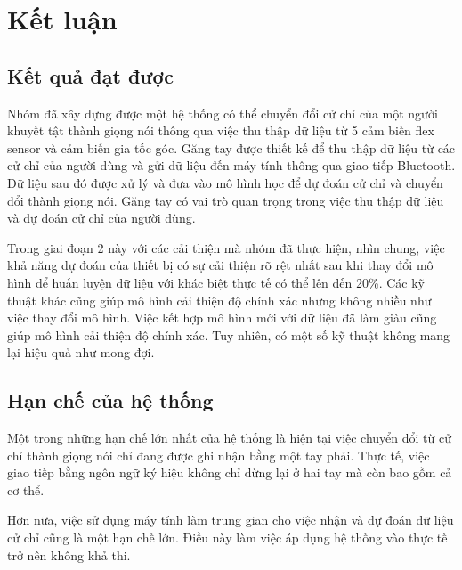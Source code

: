 \section{Kết luận}
\subsection{Kết quả đạt được}

\indent Nhóm đã xây dựng được một hệ thống có thể chuyển đổi cử chỉ của một người khuyết tật thành giọng nói thông qua việc thu thập dữ liệu từ 5 cảm biến flex sensor và cảm biến gia tốc góc. Găng tay được thiết kế để thu thập dữ liệu từ các cử chỉ của người dùng và gửi dữ liệu đến máy tính thông qua giao tiếp Bluetooth. Dữ liệu sau đó được xử lý và đưa vào mô hình học để dự đoán cử chỉ và chuyển đổi thành giọng nói. Găng tay có vai trò quan trọng trong việc thu thập dữ liệu và dự đoán cử chỉ của người dùng.


\indent Trong giai đoạn 2 này với các cải thiện mà nhóm đã thực hiện, nhìn chung, việc khả năng dự đoán của thiết bị có sự cải thiện rõ rệt nhất sau khi thay đổi mô hình để huấn luyện dữ liệu với khác biệt thực tế có thể lên đến 20\%. Các kỹ thuật khác cũng giúp mô hình cải thiện độ chính xác nhưng không nhiều như việc thay đổi mô hình. Việc kết hợp mô hình mới với dữ liệu đã làm giàu cũng giúp mô hình cải thiện độ chính xác. Tuy nhiên, có một số kỹ thuật không mang lại hiệu quả như mong đợi.

\subsection{Hạn chế của hệ thống}
\indent Một trong những hạn chế lớn nhất của hệ thống là hiện tại việc chuyển đổi từ cử chỉ thành giọng nói chỉ đang được ghi nhận bằng một tay phải. Thực tế, việc giao tiếp bằng ngôn ngữ ký hiệu không chỉ dừng lại ở hai tay mà còn bao gồm cả cơ thể. 

\indent Hơn nữa, việc sử dụng máy tính làm trung gian cho việc nhận và dự đoán dữ liệu cử chỉ cũng là một hạn chế lớn. Điều này làm việc áp dụng hệ thống vào thực tế trở nên không khả thi.

